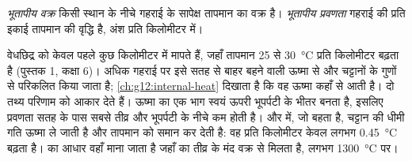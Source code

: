 \begin{definition}[भूतापीय वक्र; भूतापीय प्रवणता]\label{def:g11:lithosphere-asthenosphere:geotherm}
\emph{भूतापीय वक्र} किसी स्थान के नीचे गहराई के सापेक्ष
तापमान का वक्र है। \emph{भूतापीय प्रवणता}
गहराई की प्रति इकाई तापमान की वृद्धि है, अंश प्रति किलोमीटर में।
\end{definition}

वेधछिद्र  को केवल पहले कुछ किलोमीटर में मापते हैं, जहाँ
तापमान 25 से \qty{30}{\celsius} प्रति किलोमीटर बढ़ता है (पुस्तक 1,
कक्षा 6)। अधिक गहराई पर इसे सतह से बाहर बहने वाली ऊष्मा से
और चट्टानों के गुणों से परिकलित किया जाता है; \cref{ch:g12:internal-heat}
दिखाता है कि वह ऊष्मा कहाँ से आती है। दो तथ्य परिणाम को आकार देते हैं। ऊष्मा का
एक भाग स्वयं ऊपरी भूपर्पटी के भीतर बनता है, इसलिए प्रवणता सतह के पास
सबसे तीव्र और भूपर्पटी के नीचे कम होती है। और  में, जो
बहता है, चट्टान की धीमी गति ऊष्मा ले जाती है और तापमान को
समान कर देती है: वह प्रति किलोमीटर केवल लगभग \qty{0.45}{\celsius} बढ़ता है।
 का आधार वहाँ माना जाता है जहाँ  का तीव्र 
 के मंद वक्र से मिलता है, लगभग \qty{1300}{\celsius} पर।

